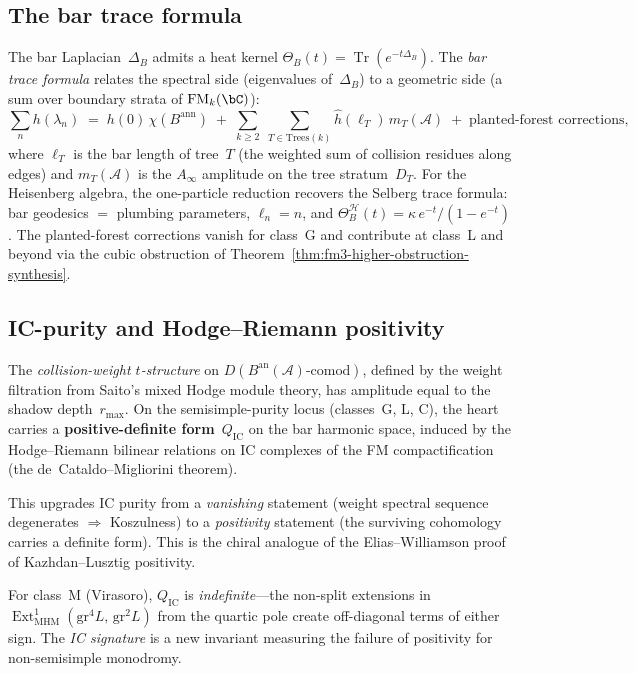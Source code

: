 \documentclass[11pt]{article}
\newcommand{\cA}{\mathcal{A}}
\newcommand{\cH}{\mathcal{H}}
\newcommand{\FM}{\mathrm{FM}}
\newcommand{\Ext}{\operatorname{Ext}}
\newcommand{\Tr}{\operatorname{Tr}}
\begin{document}
\subsection{The bar trace formula}
\label{sec:bar-trace-formula}

The bar Laplacian~$\Delta_B$ admits a heat kernel
$\Theta_B(t) = \Tr(e^{-t\Delta_B})$.
The \emph{bar trace formula} relates the spectral side
(eigenvalues of~$\Delta_B$) to a geometric side (a sum
over boundary strata of $\FM_k(\bC)$):
\[
  \sum_n h(\lambda_n)
  \;=\;
  h(0)\,\chi(B^{\mathrm{ann}})
  \;+\;
  \sum_{k \geq 2}\;
  \sum_{T \in \mathrm{Trees}(k)}
  \hat{h}(\ell_T)\, m_T(\cA)
  \;+\;
  \text{planted-forest corrections},
\]
where $\ell_T$ is the bar length of tree~$T$ (the
weighted sum of collision residues along edges)
and $m_T(\cA)$ is the $A_\infty$ amplitude on the
tree stratum~$D_T$.  For the Heisenberg algebra,
the one-particle reduction recovers the Selberg trace
formula: bar geodesics $=$ plumbing parameters,
$\ell_n = n$, and
$\Theta_B^{\cH}(t) = \kappa\, e^{-t}/(1 - e^{-t})$.
The planted-forest corrections vanish for class~G
and contribute at class~L and beyond via the cubic
obstruction of Theorem~\ref{thm:fm3-higher-obstruction-synthesis}.

\subsection{IC-purity and Hodge--Riemann positivity}
\label{sec:ic-purity-positivity}

The \emph{collision-weight $t$-structure} on
$D(B^{\mathrm{an}}(\cA)\text{-comod})$, defined by the
weight filtration from Saito's mixed Hodge module theory,
has amplitude equal to the shadow depth~$r_{\max}$.  On the
semisimple-purity locus (classes~G, L, C), the heart carries
a \textbf{positive-definite form}~$Q_{\mathrm{IC}}$ on the
bar harmonic space, induced by the Hodge--Riemann bilinear
relations on IC complexes of the FM compactification
(the de~Cataldo--Migliorini theorem).

This upgrades IC purity from a \emph{vanishing} statement
(weight spectral sequence degenerates $\Rightarrow$
Koszulness) to a \emph{positivity} statement (the surviving
cohomology carries a definite form).  This is the chiral
analogue of the Elias--Williamson proof of Kazhdan--Lusztig
positivity.

For class~M (Virasoro), $Q_{\mathrm{IC}}$ is
\emph{indefinite}---the non-split extensions in
$\Ext^1_{\mathrm{MHM}}(\mathrm{gr}^4 L,\, \mathrm{gr}^2 L)$
from the quartic pole create off-diagonal terms of either sign.
The \emph{IC signature} is a new invariant measuring the
failure of positivity for non-semisimple monodromy.
\end{document}
